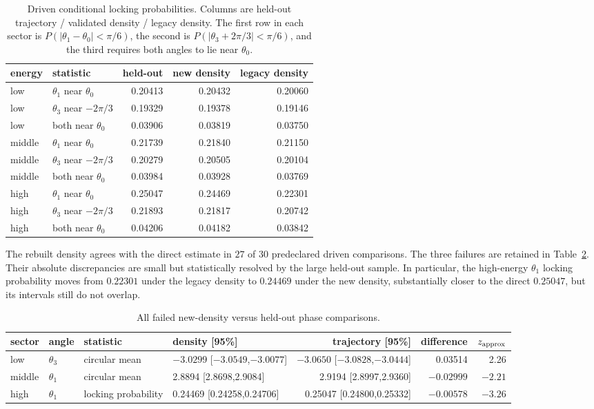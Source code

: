 \documentclass[10pt]{article}
\begin{document}
\begin{table}[ht]
\centering
\caption{Driven conditional locking probabilities.  Columns are held-out
trajectory / validated density / legacy density.  The first row in each
sector is $P(|\theta_1-\theta_0|<\pi/6)$, the second is
$P(|\theta_3+2\pi/3|<\pi/6)$, and the third requires both angles to lie near
$\theta_0$.}
\label{tab:locking}
\small
\begin{tabular}{llrrr}
\toprule
energy & statistic & held-out & new density & legacy density \\
\midrule
low & $\theta_1$ near $\theta_0$ & 0.20413 & 0.20432 & 0.20060 \\
low & $\theta_3$ near $-2\pi/3$ & 0.19329 & 0.19378 & 0.19146 \\
low & both near $\theta_0$ & 0.03906 & 0.03819 & 0.03750 \\
\addlinespace
middle & $\theta_1$ near $\theta_0$ & 0.21739 & 0.21840 & 0.21150 \\
middle & $\theta_3$ near $-2\pi/3$ & 0.20279 & 0.20505 & 0.20104 \\
middle & both near $\theta_0$ & 0.03984 & 0.03928 & 0.03769 \\
\addlinespace
high & $\theta_1$ near $\theta_0$ & 0.25047 & 0.24469 & 0.22301 \\
high & $\theta_3$ near $-2\pi/3$ & 0.21893 & 0.21817 & 0.20742 \\
high & both near $\theta_0$ & 0.04206 & 0.04182 & 0.03842 \\
\bottomrule
\end{tabular}
\end{table}

The rebuilt density agrees with the direct estimate in $27$ of $30$
predeclared driven comparisons.  The three failures are retained in
Table~\ref{tab:phasefail}.  Their absolute discrepancies are small but
statistically resolved by the large held-out sample.  In particular, the
high-energy $\theta_1$ locking probability moves from $0.22301$ under the
legacy density to $0.24469$ under the new density, substantially closer to the
direct $0.25047$, but its intervals still do not overlap.

\begin{table}[ht]
\centering
\caption{All failed new-density versus held-out phase comparisons.}
\label{tab:phasefail}
\small
\begin{tabular}{llllrrr}
\toprule
sector & angle & statistic & density [95\%] & trajectory [95\%] & difference & $z_{\rm approx}$ \\
\midrule
low & $\theta_3$ & circular mean & $-3.0299$ [$-3.0549$,$-3.0077$] & $-3.0650$ [$-3.0828$,$-3.0444$] & 0.03514 & 2.26 \\
middle & $\theta_1$ & circular mean & 2.8894 [2.8698,2.9084] & 2.9194 [2.8997,2.9360] & $-0.02999$ & $-2.21$ \\
high & $\theta_1$ & locking probability & 0.24469 [0.24258,0.24706] & 0.25047 [0.24800,0.25332] & $-0.00578$ & $-3.26$ \\
\bottomrule
\end{tabular}
\end{table}
\end{document}
